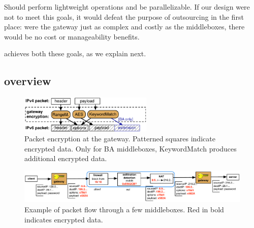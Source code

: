  Should perform lightweight operations and be parallelizable.  If our design were not to meet this goals, it would defeat the purpose of outsourcing in the first place: were the gateway just as complex and costly as the middleboxes, there would be no cost or manageability benefits.



\sys achieves both these goals, as we explain next.


\subsection{\sys overview}


\begin{figure}[t!]
\centering
  \includegraphics[width=2.5in]{fig/packet.pdf}
\caption{Packet encryption at the gateway. Patterned squares indicate encrypted data. Only for BA  middleboxes,  KeywordMatch produces additional encrypted data.  \label{fig:packet}}
\end{figure}





\begin{figure}[t!]
\centering
  \includegraphics[width=5.7in]{fig/packetpath.pdf}
\caption{Example of packet flow through a few middleboxes. Red in bold indicates encrypted data. \label{fig:packetflow}}
\end{figure}



